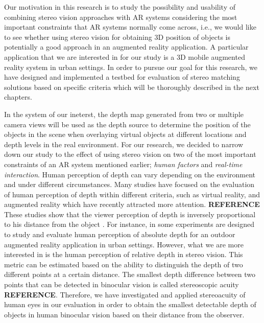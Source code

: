 \documentclass[dvips,letterpaper,12pt]{report}
\begin{document}
Our motivation in this research is to study the possibility and usability of combining stereo vision approaches with AR systems considering the most important constraints that AR systems
normally come across, i.e., we would like to see whether using stereo vision
for obtaining 3D position of objects is potentially a good approach in an augmented reality application. A particular application that we are interested in for
our study is a 3D mobile augmented reality system in urban settings. In order to pursue our goal for this research, we have designed and implemented a testbed for evaluation of
stereo matching solutions based on specific criteria which will be thoroughly described in the next chapters.

In the system of our ineterst, the depth map generated from two or multiple camera views will be used as the depth source to determine the position of the objects in the scene when
overlaying virtual objects at different locations and depth levels in the real environment. For our research, we decided to narrow down our study to the effect of using stereo vision
on two of the most important constraints of an AR system mentioned earlier; {\it human factors} and {\it real-time interaction}. {\newline}
Human perception of depth can vary depending on the environment and under different circumstances. Many studies have focused on the evaluation of human perception of depth within different
criteria, such as virtual reality, and augmented reality which have recently attracted more attention. \textbf{REFERENCE}
These studies show that the viewer perception of depth
is inversely proportional to his distance from the object \cite{kru10,swa07,jer05,liv05}. For instance, in \cite{swa07} some experiments are designed to study and evaluate human
perception of absolute depth for an outdoor augmented reality application in urban settings. 
However, what we are more interested in is the human perception of relative depth in stereo vision. This metric can be estimated based on the ability to distinguish the depth of two different points
at a certain distance. The smallest depth difference between two points that can be detected in binocular vision is called stereoscopic acuity \textbf{REFERENCE}. 
Therefore, we have investigated and applied stereoacuity of human eyes in our evaluation in order to obtain the smallest detectable depth of 
objects in human binocular vision based on their distance from the observer.
\end{document}
